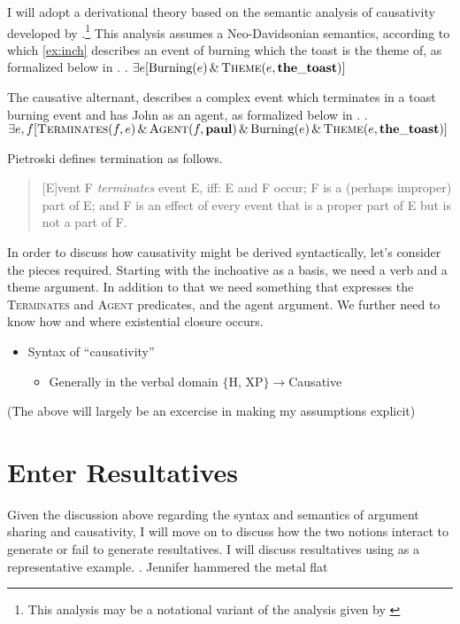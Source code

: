 \documentclass[letterpaper,12pt]{article}
\begin{document}
I will adopt a derivational theory based on the semantic analysis of causativity developed by \textcite{pietroski2003small}.\footnote{
  This analysis may be a notational variant of the analysis given by \textcite{kratzer_building_2004}
}
This analysis assumes a Neo-Davidsonian semantics, according to which \ref{ex:inch} describes an event of burning which the toast is the theme of, as formalized below in \Next.
\ex. $\exists e [\text{Burning}(e)\, \&\, \textsc{Theme}(e, \mathbf{the\_toast})]$

The causative alternant, describes a complex event which terminates in a toast burning event and has John as an agent, as formalized below in \Next.
\ex. $\exists e,f [ \textsc{Terminates}(f, e) \,\&\, \textsc{Agent}(f, \mathbf{paul}) \,\&\, \text{Burning}(e)\, \&\, \textsc{Theme}(e, \mathbf{the\_toast})]$

Pietroski defines termination as follows.
\begin{quote}
  [E]vent F \textit{terminates} event E, iff: E and F occur; F is a (perhaps improper) part of E; and F is an effect of every event that is a proper part of E but is not a part of F.\hfill\parencite[p190]{pietroski2003small}
\end{quote}

In order to discuss how causativity might be derived syntactically, let's consider the pieces required.
Starting with the inchoative as a basis, we need a verb and a theme argument.
In addition to that we need something that expresses the \textsc{Terminates} and \textsc{Agent} predicates, and the agent argument.
We further need to know how and where existential closure occurs.



\begin{itemize}
  \item Syntax of ``causativity''
    \begin{itemize}
      \item Generally in the verbal domain $\{\text{H, XP}\} \rightarrow $Causative
    \end{itemize}
\end{itemize}

(The above will largely be an excercise in making my assumptions explicit)

\section{Enter Resultatives}
Given the discussion above regarding the syntax and semantics of argument sharing and causativity, I will move on to discuss how the two notions interact to generate or fail to generate resultatives.
I will discuss resultatives using \Next as a representative example.
\ex. Jennifer hammered the metal flat
\end{document}
